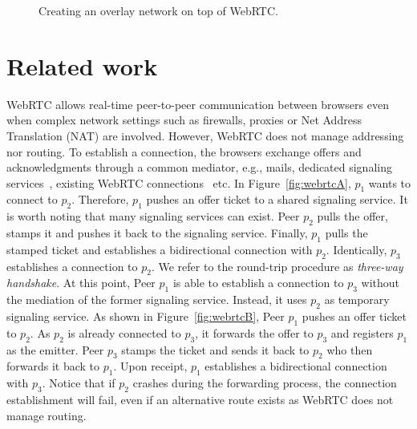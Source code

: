 
\begin{figure*}
\centering
{}
\hspace{5pt}
\hspace{5pt}
\caption{\label{fig:webrtc}Creating an overlay network on top of WebRTC.}
\end{figure*}


\section{Related work}
\label{sec:relatedwork}


WebRTC allows real-time peer-to-peer communication between browsers even when
complex network settings such as firewalls, proxies or Net Address Translation
(NAT) are involved. However, WebRTC does not manage addressing nor routing. To
establish a connection, the browsers exchange offers and acknowledgments through
a common mediator, e.g., mails, dedicated signaling services~\cite{peerjs},
existing WebRTC connections~\cite{p} etc. In Figure~\ref{fig:webrtcA}, $p_1$
wants to connect to $p_2$. Therefore, $p_1$ pushes an offer ticket to a shared
signaling service. It is worth noting that many signaling services can
exist. Peer $p_2$ pulls the offer, stamps it and pushes it back to the signaling
service. Finally, $p_1$ pulls the stamped ticket and establishes a bidirectional
connection with $p_2$.  Identically, $p_3$ establishes a connection to $p_2$. We
refer to the round-trip procedure as \emph{three-way handshake}. At this point,
Peer $p_1$ is able to establish a connection to $p_3$ without the mediation of
the former signaling service.  Instead, it uses $p_2$ as temporary signaling
service.  As shown in Figure~\ref{fig:webrtcB}, Peer $p_1$ pushes an offer
ticket to $p_2$. As $p_2$ is already connected to $p_3$, it forwards the offer
to $p_3$ and registers $p_1$ as the emitter. Peer $p_3$ stamps the ticket and
sends it back to $p_2$ who then forwards it back to $p_1$. Upon receipt, $p_1$
establishes a bidirectional connection with $p_3$.  Notice that if $p_2$ crashes
during the forwarding process, the connection establishment will fail, even if
an alternative route exists as WebRTC does not manage routing.

